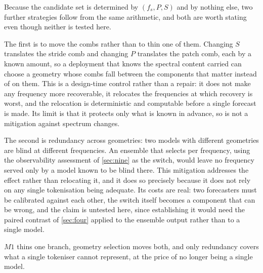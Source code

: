 Because the candidate set is determined by $(f_s,P,S)$ and by nothing else, two further strategies follow from the same arithmetic, and both are worth stating even though neither is tested here.

The first is to move the combs rather than to thin one of them. Changing $S$ translates the stride comb and changing $P$ translates the patch comb, each by a known amount, so a deployment that knows the spectral content carried can choose a geometry whose combs fall between the components that matter instead of on them. This is a design-time control rather than a repair: it does not make any frequency more recoverable, it relocates the frequencies at which recovery is worst, and the relocation is deterministic and computable before a single forecast is made. Its limit is that it protects only what is known in advance, so is not a mitigation against spectrum changes.

The second is redundancy across geometries: two models with different geometries are blind at different frequencies. An ensemble that selects per frequency, using the observability assessment of \autoref{sec:nine} as the switch, would leave no frequency served only by a model known to be blind there. This mitigation addresses the effect rather than relocating it, and it does so precisely because it does not rely on any single tokenisation being adequate. Its costs are real: two forecasters must be calibrated against each other, the switch itself becomes a component that can be wrong, and the claim is untested here, since establishing it would need the paired contrast of \autoref{sec:four} applied to the ensemble output rather than to a single model.

$M1$ thins one branch, geometry selection moves both, and only redundancy covers what a single tokeniser cannot represent, at the price of no longer being a single model.
